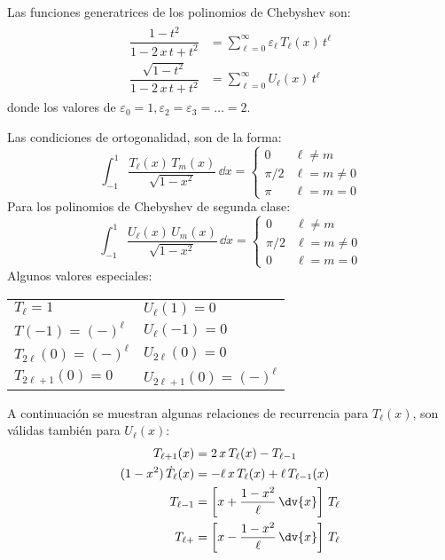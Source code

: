 Las funciones generatrices de los polinomios de Chebyshev son:
\begin{align}
\begin{aligned}
\dfrac{1 - t^{2}}{1 - 2 \, x \, t + t^{2}} &= \sum_{\ell=0}^{\infty} \varepsilon_{\ell} \, T_{\ell} (x) \, t^{\ell} \\[0.5em]
\dfrac{\sqrt{1 - t^{2}}}{1 - 2 \, x \, t + t^{2}} &= \sum_{\ell=0}^{\infty} U_{\ell} (x) \, t^{\ell}
\end{aligned}
\label{eq:ecuacion_08_88}
\end{align}
donde los valores de $\varepsilon_{0} = 1, \varepsilon_{2} = \varepsilon_{3} = \ldots = 2$.
\par
Las condiciones de ortogonalidad, son de la forma:
\[ \int_{-1}^{1} \dfrac{T_{\ell} (x) \, T_{m} (x)}{\sqrt{1 - x^{2}}} \, \dd x = 
\begin{cases}
0 & \ell \neq m \\
\pi/2 & \ell = m \neq 0 \\
\pi & \ell = m = 0
\end{cases} \]
Para los polinomios de Chebyshev de segunda clase:
\[ \int_{-1}^{1} \dfrac{U_{\ell} (x) \, U_{m} (x)}{\sqrt{1 - x^{2}}} \, \dd x = 
\begin{cases}
0     & \ell \neq m     \\
\pi/2 & \ell = m \neq 0 \\
0   & \ell = m = 0    
\end{cases} \]
Algunos valores especiales:
\begin{table}[H]
\centering
\begin{tabular}{>{\raggedright\arraybackslash}p{5cm} >{\raggedright\arraybackslash}p{5cm}}
$T_{\ell}=1$ & $U_{\ell}(1)=0$ \\
$T(-1) = (-)^{\ell}$ & $U_{\ell}(-1) = 0$ \\
$T_{2 \ell}(0) = (-)^{\ell}$ & $U_{2 \ell}(0) = 0$ \\
$T_{2 \ell+1}(0) = 0$ & $U_{2 \ell+1}(0) = (-)^{\ell}$ \\ 
\end{tabular}
\end{table}
A continuación se muestran algunas relaciones de recurrencia para $T_{\ell}(x)$, son válidas también para $U_{\ell}(x)$:
\begin{align*}
T_{\ell+1}(x) &= 2 \, x \, T_{\ell} (x) - T_{\ell-1} \\
(1 - x^{2}) \, \dot{T}_{\ell}(x) &= -\ell \, x \, T_{\ell}(x) + \ell \, T_{\ell-1} (x) \\
T_{\ell-1} &= \left[ x + \dfrac{1 - x^{2}}{\ell} \, \dv{x} \right] \, T_{\ell} \\
T_{\ell+} &= \left[ x - \dfrac{1 - x^{2}}{\ell} \, \dv{x} \right] \, T_{\ell} \\
\end{align*}
